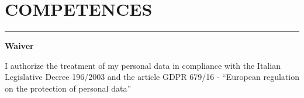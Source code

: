 \documentclass[10pt]{article}
\newcommand{\cvsection}[1]{\section*{\centering\normalsize\uppercase{#1}}\vspace{-16pt}\rule{\linewidth}{0.2pt}\vspace{6pt}}
\begin{document}

\cvsection{competences}


\vfill
{\centering \textbf{Waiver} \par}
I authorize the treatment of my personal data in compliance with the Italian Legislative Decree 196/2003 and the article GDPR 679/16 - “European regulation on the protection of personal data”
\end{document}
